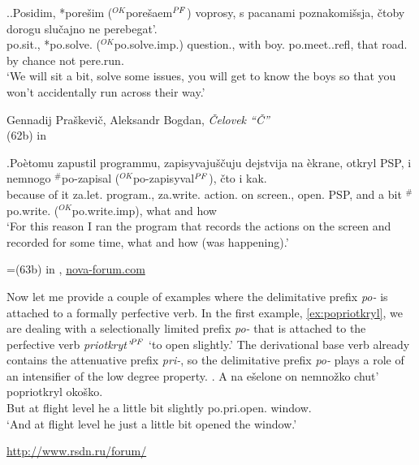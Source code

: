 \ex.\label{ex:po:Tat}\ag.\label{ex:po:Tat1}Posidim, *pore\v{s}im ($^{\textit{OK}}$pore\v{s}aem$^{\mathit{PF}}$) voprosy, s pacanami poznakomi\v{s}sja, \v{c}toby dorogu slu\v{c}ajno ne perebegat'.\\
po.sit., *po.solve. ($^{\textit{OK}}$po.solve.imp.) question., with boy. po.meet..refl, that road. {by chance} not pere.run.\\
\vspace{0.5em}
`We will sit a bit, solve some issues, you will get to know the boys so that you won't accidentally run across their way.'
\begin{flushright}
\vspace{-0.5em}
Gennadij Pra\v{s}kevi\v{c}, Aleksandr Bogdan, \textit{\v{C}elovek ``\v{C}''}\\
(62b) in \citealt{Tatevosov:09}
\end{flushright}
\bg.\label{ex:po:Tat2}Po\`{e}tomu zapustil programmu, zapisyvaju\v{s}\v{c}uju dejstvija na \`{e}krane, otkryl PSP, i nemnogo $^\#$po-zapisal ($^{\textit{OK}}$po-zapisyval$^{\mathit{PF}}$), \v{c}to i kak.\\
{because of it} za.let. program., za.write. action. on screen., open. PSP, and {a bit} $^\#$po.write. ($^{\textit{OK}}$po.write.imp), what and how\\
\vspace{0.5em}
`For this reason I ran the program that records the actions on the screen and recorded for some time, what and how (was happening).'
\begin{flushright}
\vspace{-0.5em}
=(63b) in \citealt{Tatevosov:09}, \url{nova-forum.com}
\end{flushright}

Now let me provide a couple of examples where the delimitative prefix \textit{po-} is attached to a formally perfective verb. In the first example, \ref{ex:popriotkryl}, we are dealing with a selectionally limited prefix \textit{po-} that is attached to the perfective verb \textit{priotkryt'$^{\mathit{PF}}$} `to open slightly.' The derivational base verb already contains the attenuative prefix \textit{pri-}, so the delimitative prefix \textit{po-} plays a role of an intensifier of the low degree property. 
\exg. \label{ex:popriotkryl}A na e\v{s}elone on nemno\v{z}ko chut' popriotkryl oko\v{s}ko.\\
But at {flight level} he {a little bit} {slightly} po.pri.open. window.\\
\vspace{0.5em}
`And at flight level he just a little bit opened the window.'
\begin{flushright}
\vspace{-1em}
\url{http://www.rsdn.ru/forum/}
\end{flushright}

